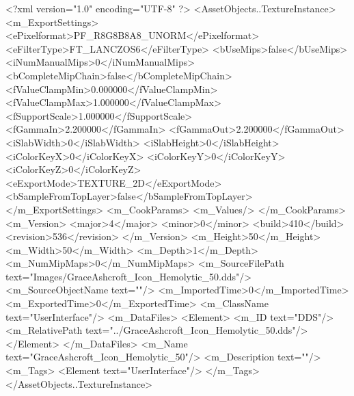 <?xml version="1.0" encoding="UTF-8" ?>
<AssetObjects..TextureInstance>
	<m_ExportSettings>
		<ePixelformat>PF_R8G8B8A8_UNORM</ePixelformat>
		<eFilterType>FT_LANCZOS6</eFilterType>
		<bUseMips>false</bUseMips>
		<iNumManualMips>0</iNumManualMips>
		<bCompleteMipChain>false</bCompleteMipChain>
		<fValueClampMin>0.000000</fValueClampMin>
		<fValueClampMax>1.000000</fValueClampMax>
		<fSupportScale>1.000000</fSupportScale>
		<fGammaIn>2.200000</fGammaIn>
		<fGammaOut>2.200000</fGammaOut>
		<iSlabWidth>0</iSlabWidth>
		<iSlabHeight>0</iSlabHeight>
		<iColorKeyX>0</iColorKeyX>
		<iColorKeyY>0</iColorKeyY>
		<iColorKeyZ>0</iColorKeyZ>
		<eExportMode>TEXTURE_2D</eExportMode>
		<bSampleFromTopLayer>false</bSampleFromTopLayer>
	</m_ExportSettings>
	<m_CookParams>
		<m_Values/>
	</m_CookParams>
	<m_Version>
		<major>4</major>
		<minor>0</minor>
		<build>410</build>
		<revision>536</revision>
	</m_Version>
	<m_Height>50</m_Height>
	<m_Width>50</m_Width>
	<m_Depth>1</m_Depth>
	<m_NumMipMaps>0</m_NumMipMaps>
	<m_SourceFilePath text="Images/GraceAshcroft_Icon_Hemolytic_50.dds"/>
	<m_SourceObjectName text=""/>
	<m_ImportedTime>0</m_ImportedTime>
	<m_ExportedTime>0</m_ExportedTime>
	<m_ClassName text="UserInterface"/>
	<m_DataFiles>
		<Element>
			<m_ID text="DDS"/>
			<m_RelativePath text="../GraceAshcroft_Icon_Hemolytic_50.dds"/>
		</Element>
	</m_DataFiles>
	<m_Name text="GraceAshcroft_Icon_Hemolytic_50"/>
	<m_Description text=""/>
	<m_Tags>
		<Element text="UserInterface"/>
	</m_Tags>
</AssetObjects..TextureInstance>
